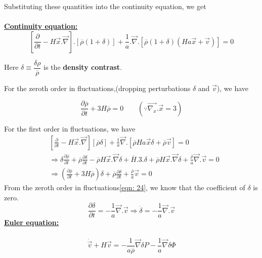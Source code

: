 \documentclass[a4,12pt,oneside]{report}
\begin{document}
	Substituting these quantities into the continuity equation, we get \\ \\
	{\bf \underline{Continuity equation:}}
	\begin{equation}\label{key}
	\left[\frac{\partial}{\partial t} - H\vec{x}.\overrightarrow{\nabla}\right].[\overline{\rho}(1+\delta)] + \frac{1}{a}.\overrightarrow{\nabla}.[\overline{\rho}(1+\delta)(Ha\vec{x}+\vec{v})] = 0
	\end{equation}
	
	\begin{center}
		Here $ \delta \equiv \dfrac{\delta\rho}{\overline{\rho}} $ is the {\bf density contrast}.
	\end{center}
	
	For the zeroth order in fluctuations,(dropping perturbations $ \delta $ and $ \vec{v} $), we have
	
	\begin{equation}\label{eqn: 24}
	\frac{\partial \overline{\rho}}{\partial t} + 3H\overline{\rho} = 0         \quad\quad (\because \overrightarrow{\nabla_x}.\vec{x} = 3)
	\end{equation}
	
	For the first order in fluctuations, we have
	\begin{align}\label{key}
	&\left[\frac{\partial}{\partial t} - H\vec{x}.\overrightarrow{\nabla}\right][\overline{\rho}\delta] + \frac{1}{a}\overrightarrow{\nabla}.[\overline{\rho}Ha\vec{x}\delta + \overline{\rho}\vec{v}] = 0 \nonumber
	\\
	&\Rightarrow\delta\frac{\partial \overline{\rho}}{\partial t} + \overline{\rho}\frac{\partial \delta}{\partial t} - \overline{\rho}H\vec{x}.\overrightarrow{\nabla}\delta + \overline H.3.\delta + \overline{\rho} H \vec{x}. \overrightarrow{\nabla} \delta + \frac{\overline{\rho}}{a}\overrightarrow{\nabla}.\vec{v} = 0 \nonumber
	\\
	&\Rightarrow\left(\frac{\partial \overline{\rho}}{\partial t} + 3H\overline{\rho}\right)\delta + \overline{\rho}\frac{\partial \delta}{\partial t} + \frac{\overline{\rho}}{a}\vec{v} = 0 \nonumber
	\end{align}
	From the zeroth order in fluctuations\eqref{eqn: 24}, we know that the coefficient of $ \delta $ is zero. 
	\begin{equation}\label{continuity}
	\frac{\partial \delta}{\partial t} = -\frac{1}{a}\overrightarrow{\nabla}.\vec{v} \Rightarrow \dot{\delta} = -\frac{1}{a}\overrightarrow{\nabla}.\vec{v}
	\end{equation}
	{\bf \underline{Euler equation:}}
	\\ \\
	\begin{equation}\label{euler}
	\dot{\vec{v}} + H\vec{v} = -\frac{1}{a\overline{\rho}}\overrightarrow{\nabla}\delta P - \frac{1}{a}\overrightarrow{\nabla}\delta\Phi
	\end{equation}
 
\end{document}
